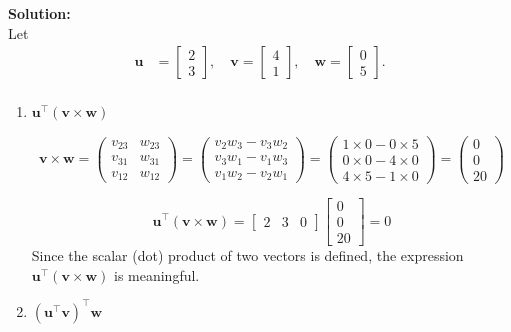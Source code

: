 \documentclass[journal]{IEEEtran}
\begin{document}
\textbf{Solution:}\\
Let \begin{align}
    \mathbf{u} &= \begin{bmatrix} 2 \\ 3 \end{bmatrix}, \quad
  \mathbf{v} = \begin{bmatrix} 4 \\ 1 \end{bmatrix}, \quad
  \mathbf{w} = \begin{bmatrix} 0 \\ 5 \end{bmatrix}.
  \\
\end{align}
\begin{enumerate}[label=\alph*)]
  \item \( \mathbf{u}^\top (\mathbf{v} \times \mathbf{w}) \)

\[
\mathbf{v} \times \mathbf{w} =
\begin{pmatrix}
v_{23} & w_{23} \\
v_{31} & w_{31} \\
v_{12} & w_{12}
\end{pmatrix}
=
\begin{pmatrix}
v_2 w_3 - v_3 w_2 \\
v_3 w_1 - v_1 w_3 \\
v_1 w_2 - v_2 w_1
\end{pmatrix}
=
\begin{pmatrix}
1 \times 0 - 0 \times 5 \\
0 \times 0 - 4 \times 0 \\
4 \times 5 - 1 \times 0
\end{pmatrix}
=
\begin{pmatrix}
0 \\
0 \\
20
\end{pmatrix}
\]

\[
\mathbf{u}^\top (\mathbf{v} \times \mathbf{w}) =
\begin{bmatrix} 2 & 3 & 0 \end{bmatrix}
\begin{bmatrix}
0 \\
0 \\
20
\end{bmatrix} = 0
\]
Since the scalar (dot) product of two vectors is defined, the expression  \(\mathbf{u} ^\top(\mathbf{v} \times \mathbf{w})\) is meaningful.
  \item \( (\mathbf{u}^\top \mathbf{v})^\top \mathbf{w} \)


\end{enumerate}
\end{document}
